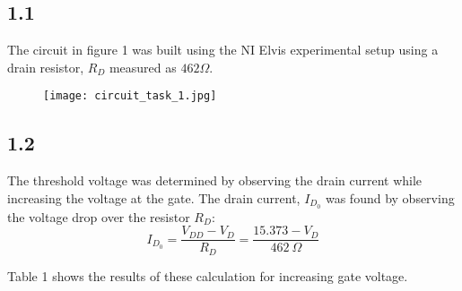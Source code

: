 \subsection*{1.1}
The circuit in figure 1 was built using the NI Elvis experimental setup using a drain resistor, $R_D$ measured as $462 \Omega$.

    \begin{figure}[h!]
        \centering
        \texttt{[image: circuit\_task\_1.jpg]}
    \end{figure}

\subsection*{1.2}
The threshold voltage was determined by observing the drain current while increasing the voltage at the gate. The drain current, $I_{D_0}$ was found by observing the voltage drop over the resistor $R_D$: $$I_{D_0} = \dfrac{V_{DD}-V_D}{R_D} = \dfrac{15.373 - V_D}{462 \ \Omega}$$ 

Table 1 shows the results of these calculation for increasing gate voltage. 

\pagebreak

